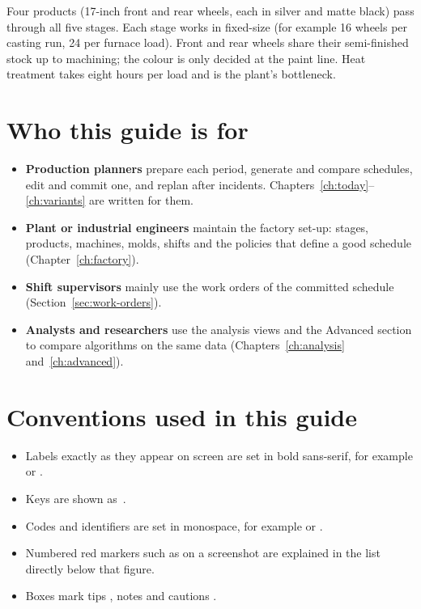 Four products (17-inch front and rear wheels, each in silver and matte black) pass through all five stages.
Each stage works in fixed-size  (for example 16 wheels per casting run, 24 per furnace load). Front
and rear wheels share their semi-finished stock up to machining; the colour is only decided at the paint line.
Heat treatment takes eight hours per load and is the plant's bottleneck.

\section{Who this guide is for}

\begin{itemize}
  \item \textbf{Production planners} prepare each period, generate and compare schedules, edit and commit
        one, and replan after incidents. Chapters~\ref{ch:today}--\ref{ch:variants} are written for them.
  \item \textbf{Plant or industrial engineers} maintain the factory set-up: stages, products, machines, molds,
        shifts and the policies that define a good schedule (Chapter~\ref{ch:factory}).
  \item \textbf{Shift supervisors} mainly use the work orders of the committed schedule
        (Section~\ref{sec:work-orders}).
  \item \textbf{Analysts and researchers} use the analysis views and the Advanced section to compare
        algorithms on the same data (Chapters~\ref{ch:analysis} and~\ref{ch:advanced}).
\end{itemize}

\section{Conventions used in this guide}

\begin{itemize}
  \item Labels exactly as they appear on screen are set in bold sans-serif, for example 
        or .
  \item Keys are shown as \,.
  \item Codes and identifiers are set in monospace, for example  or .
  \item Numbered red markers such as    on a screenshot are explained in the
        list directly below that figure.
  \item Boxes mark tips \faLightbulb[regular], notes \faInfoCircle{} and cautions \faExclamationTriangle.
\end{itemize}

